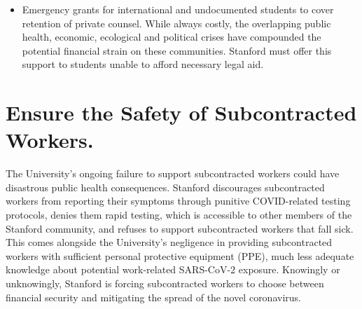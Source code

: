 \documentclass[12pt, titlepage, letterpaper]{article}
\begin{document}
\begin{itemize}
    \item Emergency grants for international and undocumented students to cover retention of private counsel. While always costly, the overlapping public health, economic, ecological and political crises have compounded the potential financial strain on these communities. Stanford must offer this support to students unable to afford necessary legal aid.

\end{itemize}

\newpage
\section*{Ensure the Safety of Subcontracted Workers.}
%
\vspace{0.3em}\hline\hline


The University’s ongoing failure to support subcontracted workers could have disastrous public health consequences. Stanford discourages subcontracted workers from reporting their symptoms through punitive COVID-related testing protocols, denies them rapid testing, which is accessible to other members of the Stanford community, and refuses to support subcontracted workers that fall sick. This comes alongside the University’s negligence in providing subcontracted workers with sufficient personal protective equipment (PPE), much less adequate knowledge about potential work-related SARS-CoV-2 exposure. Knowingly or unknowingly, Stanford is forcing subcontracted workers to choose between financial security and mitigating the spread of the novel coronavirus.
\end{document}
